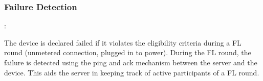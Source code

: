         \subsubsection{Failure Detection}:

        The device is declared failed if it violates the eligibility criteria during a FL round (unmetered connection, plugged in to power). During the FL round, the failure is detected using the ping and ack mechanism between the server and the device. This aids the server in keeping track of active participants of a FL round.